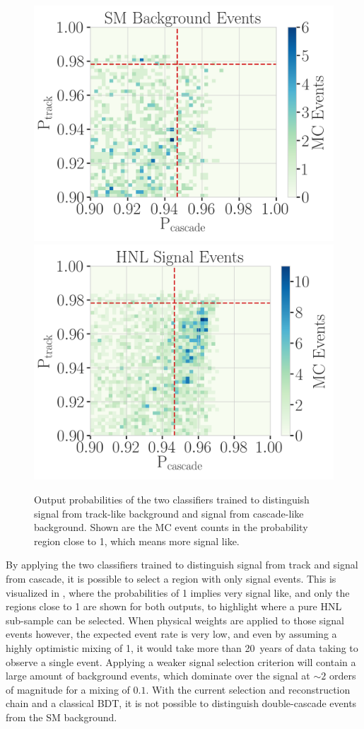 \begin{figure}[h]
	\centering
    \includegraphics[width=0.49\linewidth]{figures/results/190607/classification/cascade_vs_track_class_prob_background_full_stats.png}
    \includegraphics[width=0.49\linewidth]{figures/results/190607/classification/cascade_vs_track_class_prob_hnl_full_stats.png}
    \caption[Double-cascade classifier probabilities]{Output probabilities of the two classifiers trained to distinguish signal from track-like background and signal from cascade-like background. Shown are the MC event counts in the probability region close to 1, which means more signal like.}
\end{figure}

By applying the two classifiers trained to distinguish signal from track and signal from cascade, it is possible to select a region with only signal events. This is visualized in , where the probabilities of 1 implies very signal like, and only the regions close to 1 are shown for both outputs, to highlight where a pure HNL sub-sample can be selected. When physical weights are applied to those signal events however, the expected event rate is very low, and even by assuming a highly optimistic mixing of 1, it would take more than \SI{20}{years} of data taking to observe a single event. Applying a weaker signal selection criterion will contain a large amount of background events, which dominate over the signal at $\sim2$ orders of magnitude for a mixing of $0.1$. With the current selection and reconstruction chain and a classical BDT, it is not possible to distinguish double-cascade events from the SM background.



